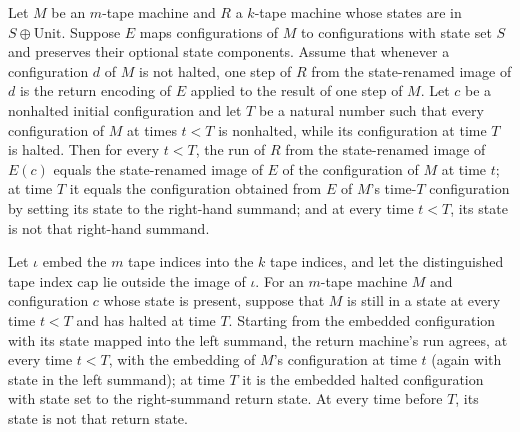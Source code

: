 \begin{lemma}
\label{Turing.embedThroughHalt}
\leanok
{}
Let $M$ be an $m$-tape machine and $R$ a $k$-tape machine whose states are in
$S\oplus\mathrm{Unit}$. Suppose $E$ maps configurations of $M$ to configurations with
state set $S$ and preserves their optional state components. Assume that whenever a
configuration $d$ of $M$ is not halted, one step of $R$ from the state-renamed image of
$d$ is the return encoding of $E$ applied to the result of one step of $M$. Let $c$ be a
nonhalted initial configuration and let $T$ be a natural number such that every
configuration of $M$ at times $t<T$ is nonhalted, while its configuration at time $T$ is
halted. Then for every $t<T$, the run of $R$ from the state-renamed image of $E(c)$
equals the state-renamed image of $E$ of the configuration of $M$ at time $t$; at time
$T$ it equals the configuration obtained from $E$ of $M$'s time-$T$ configuration by
setting its state to the right-hand summand; and at every time $t<T$, its state is not
that right-hand summand.
\end{lemma}

\begin{theorem}
\label{Turing.embedSilentRetTM_run}
\leanok
{}
Let $\iota$ embed the $m$ tape indices into the $k$ tape indices, and let the
distinguished tape index $\mathrm{cap}$ lie outside the image of $\iota$. For an
$m$-tape machine $M$ and configuration $c$ whose state is present, suppose that $M$ is
still in a state at every time $t<T$ and has halted at time $T$. Starting from the
embedded configuration with its state mapped into the left summand, the return machine's
run agrees, at every time $t<T$, with the embedding of $M$'s configuration at time $t$
(again with state in the left summand); at time $T$ it is the embedded halted
configuration with state set to the right-summand return state. At every time before
$T$, its state is not that return state.
\end{theorem}

